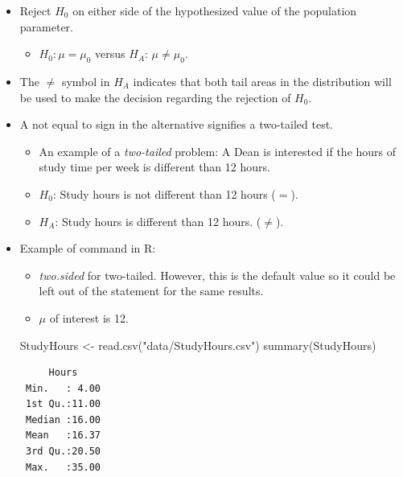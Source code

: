 \documentclass[
  letterpaper,
  DIV=11,
  numbers=noendperiod]{scrreprt}
\newenvironment{Shaded}{\begin{snugshade}}{\end{snugshade}}
\newcommand{\FunctionTok}[1]{\textcolor[rgb]{0.28,0.35,0.67}{#1}}
\newcommand{\NormalTok}[1]{\textcolor[rgb]{0.00,0.23,0.31}{#1}}
\newcommand{\OtherTok}[1]{\textcolor[rgb]{0.00,0.23,0.31}{#1}}
\newcommand{\StringTok}[1]{\textcolor[rgb]{0.13,0.47,0.30}{#1}}
\providecommand{\tightlist}{%
  \setlength{\itemsep}{0pt}\setlength{\parskip}{0pt}}\usepackage{longtable,booktabs,array}
\begin{document}
\begin{itemize}
\item
  Reject \(H_0\) on either side of the hypothesized value of the
  population parameter.

  \begin{itemize}
  \tightlist
  \item
    \(H_0: \mu =\mu_0\) versus \(H_A\): \(\mu \neq \mu_0\).
  \end{itemize}
\item
  The \(\neq\) symbol in \(H_A\) indicates that both tail areas in the
  distribution will be used to make the decision regarding the rejection
  of \(H_0\).
\item
  A not equal to sign in the alternative signifies a two-tailed test.

  \begin{itemize}
  \tightlist
  \item
    An example of a \emph{two-tailed} problem: A Dean is interested if
    the hours of study time per week is different than 12 hours.
  \item
    \(H_0\): Study hours is not different than 12 hours (\(=\)).
  \item
    \(H_A\): Study hours is different than 12 hours. (\(\neq\)).
  \end{itemize}
\item
  Example of command in R:

  \begin{itemize}
  \tightlist
  \item
    \emph{two.sided} for two-tailed. However, this is the default value
    so it could be left out of the statement for the same results.
  \item
    \(\mu\) of interest is 12.
  \end{itemize}

\begin{Shaded}
\begin{Highlighting}[]
\NormalTok{StudyHours }\OtherTok{\textless{}{-}} \FunctionTok{read.csv}\NormalTok{(}\StringTok{"data/StudyHours.csv"}\NormalTok{)}
\FunctionTok{summary}\NormalTok{(StudyHours)}
\end{Highlighting}
\end{Shaded}

\begin{verbatim}
     Hours      
 Min.   : 4.00  
 1st Qu.:11.00  
 Median :16.00  
 Mean   :16.37  
 3rd Qu.:20.50  
 Max.   :35.00  
\end{verbatim}


\end{itemize}
\end{document}
